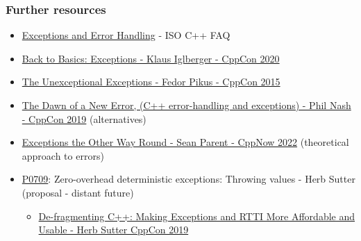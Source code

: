 \begin{advanced}
\begin{frame}[fragile]
  \frametitle{Further resources}
  \begin{block}{}
    \begin{itemize}
      \item \href{https://isocpp.org/wiki/faq/exceptions}{Exceptions and Error Handling} - ISO C++ FAQ
      \item \href{https://www.youtube.com/watch?v=0ojB8c0xUd8&t=1505s}{Back to Basics: Exceptions - Klaus Iglberger - CppCon 2020}
      \item \href{https://www.youtube.com/watch?v=fOV7I-nmVXw}{The Unexceptional Exceptions - Fedor Pikus - CppCon 2015}
      \item \href{https://www.youtube.com/watch?v=ZUH8p1EQswA}{The Dawn of a New Error, (C++ error-handling and exceptions) - Phil Nash - CppCon 2019} (alternatives)
      \item \href{https://www.youtube.com/watch?v=mkkaAWNE-Ig}{Exceptions the Other Way Round - Sean Parent - CppNow 2022} (theoretical approach to errors)
      \item \href{https://wg21.link/P0709}{P0709}: Zero-overhead deterministic exceptions: Throwing values - Herb Sutter (proposal - distant future)
      \begin{itemize}
        \item \href{https://www.youtube.com/watch?v=ARYP83yNAWk}{De-fragmenting C++: Making Exceptions and RTTI More Affordable and Usable - Herb Sutter CppCon 2019}
      \end{itemize}
    \end{itemize}
  \end{block}
\end{frame}
\end{advanced}
